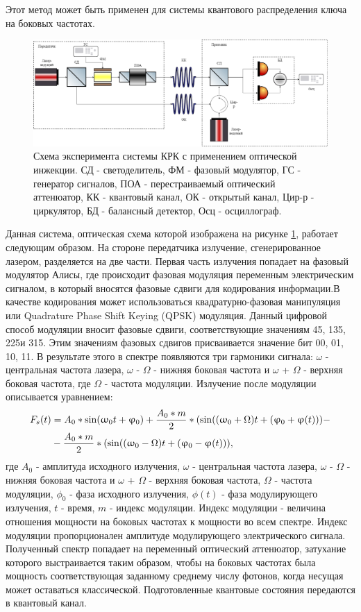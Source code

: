 Этот метод может быть применен для системы квантового распределения ключа на боковых частотах.
\begin{figure}
    \centering
    \includegraphics[width=\textwidth]{images/Схема с обратной связью.png}
    \caption{Схема эксперимента системы КРК с применением оптической инжекции. СД - светоделитель, ФМ - фазовый модулятор, ГС - генератор сигналов, ПОА - перестраиваемый оптический аттенюатор, КК - квантовый канал, ОК - открытый канал, Цир-р - циркулятор, БД - балансный детектор, Осц - осциллограф.}
    \label{fig:opt inj scheme}
\end{figure}
Данная система, оптическая схема которой изображена на рисунке \ref{fig:opt inj scheme}, работает следующим образом. На стороне передатчика излучение, сгенерированное лазером, разделяется на две части. Первая часть излучения попадает на фазовый модулятор Алисы, где происходит фазовая модуляция переменным электрическим сигналом, в который вносятся фазовые сдвиги для кодирования информации.В качестве кодирования может использоваться квадратурно-фазовая манипуляция или Quadrature Phase Shift Keying (QPSK) модуляция. Данный цифровой способ модуляции вносит фазовые сдвиги, соответствующие значениям 45\textdegree, 135\textdegree, 225\textdegree и 315\textdegree. Этим значениям фазовых сдвигов присваивается значение бит {00, 01, 10, 11}. В результате этого в спектре появляются три гармоники сигнала: $\omega$ - центральная частота лазера, $\omega$ - $\Omega$ - нижняя боковая частота  и $\omega$ + $\Omega$ - верхняя боковая частота, где $\Omega$ - частота модуляции. Излучение после модуляции описывается уравнением: 
\begin{align}
\label{eq:spectrum seed}
F_s(t) & = A_0 * \sin(\omega_0 t + \phi_0) + \frac{A_0 * m}{2} * (\sin((\omega_0 + \Omega)t + (\phi_0 + \phi (t))) - \notag \\
&- \frac{A_0 * m}{2} * (\sin((\omega_0 - \Omega)t + (\phi_0 - \phi (t))),
\end{align}где $A_0$ - амплитуда исходного излучения,  $\omega$ - центральная частота лазера, $\omega$ - $\Omega$ - нижняя боковая частота  и $\omega$ + $\Omega$ - верхняя боковая частота, $\Omega$ - частота модуляции, $\phi_0$ - фаза исходного излучения, $\phi(t)$ - фаза модулирующего излучения, $t$ - время, $m$ - индекс модуляции. Индекс модуляции - величина отношения мощности на боковых частотах к мощности во всем спектре. Индекс модуляции пропорционален амплитуде модулирующего электрического сигнала.  Полученный спектр попадает на переменный оптический аттенюатор, затухание которого выстраивается таким образом, чтобы на боковых частотах была мощность соответствующая заданному среднему числу фотонов, когда несущая может оставаться классической. Подготовленные квантовые состояния передаются в квантовый канал. 
